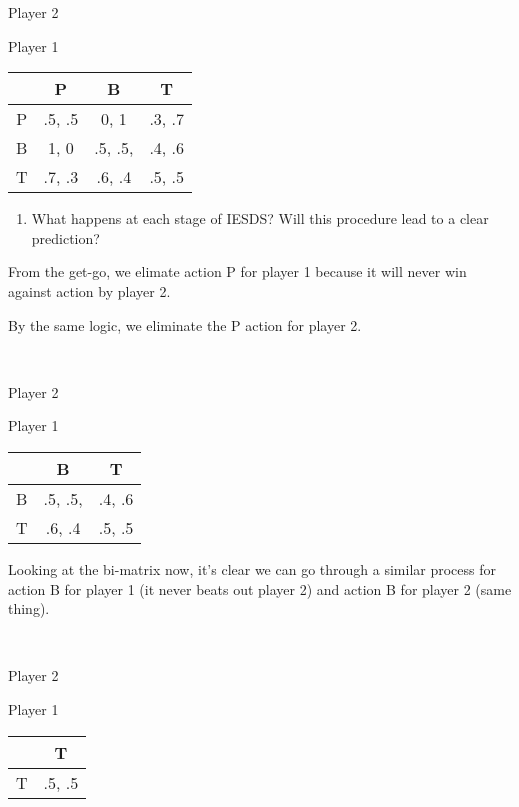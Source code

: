 \documentclass{article}
\begin{document}
\begin{enumerate}
          \centerline{Player 2}
          \begin{center}
              Player 1
              \begin{tabular}{|c|c|c|c|}
                  \hline
                    & P      & B       & T      \\ \hline
                  P & .5, .5 & 0, 1    & .3, .7 \\ \hline
                  B & 1, 0   & .5, .5, & .4, .6 \\ \hline
                  T & .7, .3 & .6, .4  & .5, .5 \\ \hline
              \end{tabular}
          \end{center}

          \begin{enumerate}[resume]
              \item What happens at each stage of IESDS? Will this procedure lead to a clear prediction?
          \end{enumerate}

          From the get-go, we elimate action P for player 1 because it will never win against action by player 2.

          By the same logic, we eliminate the P action for player 2.

          \,

          \centerline{Player 2}
          \begin{center}
              Player 1
              \begin{tabular}{|c|c|c|}
                  \hline
                    & B       & T      \\ \hline
                  B & .5, .5, & .4, .6 \\ \hline
                  T & .6, .4  & .5, .5 \\ \hline
              \end{tabular}
          \end{center}

          Looking at the bi-matrix now, it's clear we can go through a similar process for action B for player 1 (it never beats out player 2) and action B for player 2 (same thing).

          \,

          \centerline{Player 2}
          \begin{center}
              Player 1
              \begin{tabular}{|c|c|}
                  \hline
                    & T      \\ \hline
                  T & .5, .5 \\ \hline
              \end{tabular}
          \end{center}


\end{enumerate}
\end{document}
